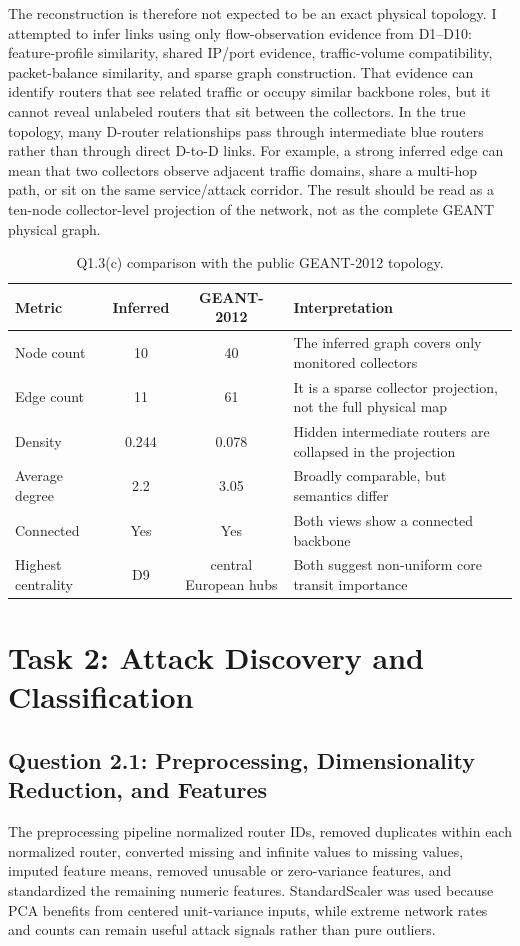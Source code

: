\documentclass[journal,onecolumn]{IEEEtran}
\begin{document}
The reconstruction is therefore not expected to be an exact physical topology. I attempted to infer links using only flow-observation evidence from D1--D10: feature-profile similarity, shared IP/port evidence, traffic-volume compatibility, packet-balance similarity, and sparse graph construction. That evidence can identify routers that see related traffic or occupy similar backbone roles, but it cannot reveal unlabeled routers that sit between the collectors. In the true topology, many D-router relationships pass through intermediate blue routers rather than through direct D-to-D links. For example, a strong inferred edge can mean that two collectors observe adjacent traffic domains, share a multi-hop path, or sit on the same service/attack corridor. The result should be read as a ten-node collector-level projection of the network, not as the complete GEANT physical graph.

\begin{table}[!t]
\caption{Q1.3(c) comparison with the public GEANT-2012 topology.}
\label{tab:q1_geant}
\centering
\small
\begin{tabularx}{0.92\linewidth}{@{}lccY@{}}
\toprule
Metric & Inferred & GEANT-2012 & Interpretation \\
\midrule
Node count & 10 & 40 & The inferred graph covers only monitored collectors \\
Edge count & 11 & 61 & It is a sparse collector projection, not the full physical map \\
Density & 0.244 & 0.078 & Hidden intermediate routers are collapsed in the projection \\
Average degree & 2.2 & 3.05 & Broadly comparable, but semantics differ \\
Connected & Yes & Yes & Both views show a connected backbone \\
Highest centrality & D9 & central European hubs & Both suggest non-uniform core transit importance \\
\bottomrule
\end{tabularx}
\end{table}

\section{Task 2: Attack Discovery and Classification}

\subsection{Question 2.1: Preprocessing, Dimensionality Reduction, and Features}
The preprocessing pipeline normalized router IDs, removed duplicates within each normalized router, converted missing and infinite values to missing values, imputed feature means, removed unusable or zero-variance features, and standardized the remaining numeric features. StandardScaler was used because PCA benefits from centered unit-variance inputs, while extreme network rates and counts can remain useful attack signals rather than pure outliers.
\end{document}
